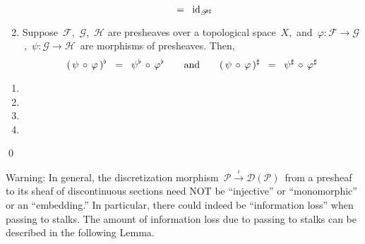 \begin{theorem}
\begin{enumerate}
\begin{equation*}
	\;\; = \;\;
		\textnormal{id}_{\mathscr{P}^{\sharp}}
	\end{equation*}
\item
	Suppose \,$\mathscr{F}$, \,$\mathscr{G}$, \,$\mathscr{H}$ are presheaves over a topological space \,$X$,\,
	and
	\,$\varphi : \mathscr{F} \longrightarrow \mathscr{G}$\,,
	\,$\psi : \mathscr{G} \longrightarrow \mathscr{H}$\,
	are morphisms of presheaves.
	Then,
	\begin{equation*}
	(\,\psi \,\circ\, \varphi\,)^{\flat}
	\;\; = \;\;
		\psi^{\flat} \,\circ\, \varphi^{\flat}
	\quad\quad\textnormal{and}\quad\quad
	(\,\psi \,\circ\, \varphi\,)^{\sharp}
	\;\; = \;\;
		\psi^{\sharp} \,\circ\, \varphi^{\sharp}
	\end{equation*}
\end{enumerate}
\end{theorem}



\vskip 0.3cm
\proof
\begin{enumerate}
\item
\item
\item
\item
\end{enumerate}
\qed


\vskip 0.5cm
\begin{remark}
\mbox{}\vskip 0.1cm
\noindent
Warning:\; In general, the discretization morphism
\,$\mathscr{P} \overset{\iota}{\longrightarrow} \mathscr{D}(\mathscr{P})$\,
from a presheaf to its sheaf of discontinuous sections
need NOT be ``injective'' or ``monomorphic'' or an ``embedding.''
In particular, there could indeed be ``information loss'' when passing to stalks.
The amount of information loss due to passing to stalks can be described in the following Lemma.
\end{remark}

